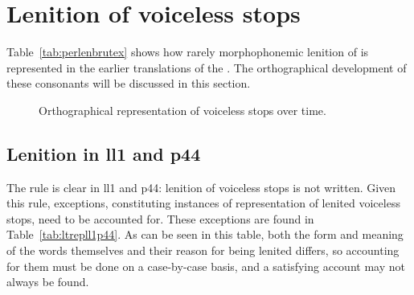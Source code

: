 \section{Lenition of voiceless stops}
\label{sec:lenit-voic-stops}

Table~\ref{tab:perlenbrutex} shows how rarely morphophonemic lenition of  is represented in the earlier translations of the . The orthographical development of these consonants will be discussed in this section.

\begin{figure}[h]
  \centering
  \caption{Orthographical representation of voiceless stops over time.}
  \label{fig:linechartbrut}
\end{figure}

\subsection{Lenition in \acrshort{ll1} and \acrshort{p44}}
\label{sec:lenit-acrsh-acrsh}

The rule is clear in \gls{ll1} and \gls{p44}: lenition of voiceless stops is not written.
Given this rule, exceptions, constituting instances of representation of lenited voiceless stops, need to be accounted for.
These exceptions are found in Table~\ref{tab:ltrepll1p44}.
As can be seen in this table, both the form and meaning of the words themselves and their reason for being lenited differs, so accounting for them must be done on a case-by-case basis, and a satisfying account may not always be found.

